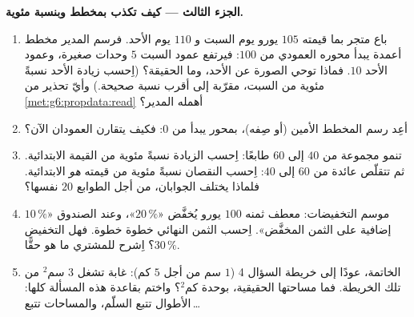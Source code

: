 \begin{problem}
\medskip
\noindent\textbf{الجزء الثالث --- كيف تكذب بمخطط
وبنسبة مئوية.}
\begin{enumerate}[resume]
  \item باع متجر بما قيمته $105$ يورو يوم السبت و $110$ يوم
        الأحد. فرسم المدير مخطط أعمدة يبدأ محوره
        العمودي من $100$: فيرتفع عمود السبت $5$ وحدات
        صغيرة، وعمود الأحد $10$. فماذا توحي الصورة
        عن الأحد، وما الحقيقة؟ (اِحسب
        زيادة الأحد نسبةً مئوية من السبت، مقرّبة إلى أقرب
        نسبة صحيحة.) وأيّ تحذير من
        \cref{met:g6:propdata:read} أهمله المدير؟
  \item أعِد رسم المخطط الأمين (أو صِفه)، بمحور
        يبدأ من $0$: فكيف يتقارن العمودان الآن؟
  \item تنمو مجموعة من $40$ إلى $60$ طابعًا: اِحسب
        الزيادة نسبةً مئوية من القيمة الابتدائية. ثم
        تتقلّص عائدة من $60$ إلى $40$: اِحسب النقصان
        نسبةً مئوية من قيمته \emph{هو} الابتدائية. فلماذا يختلف
        الجوابان، من أجل الطوابع $20$ نفسها؟
  \item موسم التخفيضات: معطف ثمنه $100$ يورو يُخفَّض «$20\,\%$»،
        وعند الصندوق «$10\,\%$ إضافية على
        الثمن المخفَّض». اِحسب الثمن النهائي خطوة خطوة.
        فهل  التخفيض $30\,\%$؟ اِشرح للمشتري
        ما هو حقًّا.
  \item الخاتمة، عودًا إلى خريطة السؤال 4 ($1$ سم من أجل
        $5$ كم): غابة تشغل $3$ سم$^2$ من تلك الخريطة. فما
        مساحتها الحقيقية، بوحدة كم$^2$؟ واختم بقاعدة
        هذه المسألة كلها: الأطوال تتبع السلّم، والمساحات
        تتبع\,\dots
\end{enumerate}
\end{problem}
